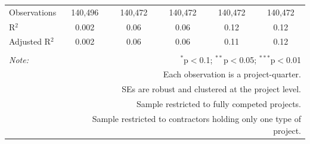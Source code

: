 \documentclass[
]{article}
\begin{document}
\begin{table}[H]
\begin{tabular}{@{\extracolsep{-2pt}}lccccc}
Observations & 140,496 & 140,472 & 140,472 & 140,472 & 140,472 \\ 
R$^{2}$ & 0.002 & 0.06 & 0.06 & 0.12 & 0.12 \\ 
Adjusted R$^{2}$ & 0.002 & 0.06 & 0.06 & 0.11 & 0.12 \\ 
\hline 
\hline \\[-1.8ex] 
\textit{Note:}  & \multicolumn{5}{r}{$^{*}$p$<$0.1; $^{**}$p$<$0.05; $^{***}$p$<$0.01} \\ 
 & \multicolumn{5}{r}{Each observation is a project-quarter.} \\ 
 & \multicolumn{5}{r}{SEs are robust and clustered at the project level.} \\ 
 & \multicolumn{5}{r}{Sample restricted to fully competed projects.} \\ 
 & \multicolumn{5}{r}{Sample restricted to contractors holding only one type of project.} \\ 
\end{tabular} 
\end{table}
\end{document}
